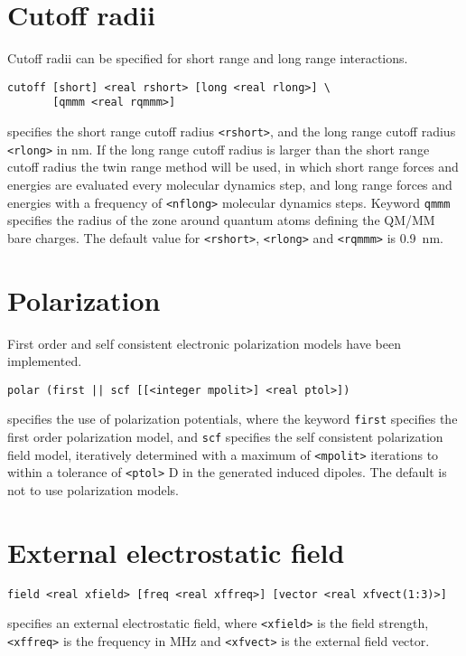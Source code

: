 \section{Cutoff radii}
Cutoff radii can be specified for short range and long range interactions.
\begin{description}
\item
\begin{verbatim}
cutoff [short] <real rshort> [long <real rlong>] \
       [qmmm <real rqmmm>]
\end{verbatim}
specifies the short range cutoff radius \verb+<rshort>+, and the long range
cutoff radius \verb+<rlong>+ in nm. If the long range cutoff radius
is larger than the short range cutoff radius the twin range method will
be used, in which short range forces and energies are evaluated every
molecular dynamics step, and long range forces and energies with a
frequency of \verb+<nflong>+ molecular dynamics steps. Keyword
\verb+qmmm+ specifies the radius of the zone around quantum atoms
defining the QM/MM bare charges.
The default value for \verb+<rshort>+, \verb+<rlong>+ and \verb+<rqmmm>+ 
is 0.9~nm.
\end{description}

\section{Polarization}
First order and self consistent electronic polarization models have
been implemented.
\begin{description}
\item
\begin{verbatim}
polar (first || scf [[<integer mpolit>] <real ptol>])
\end{verbatim}
specifies the use of polarization potentials,
where the keyword {\tt first} specifies the first order polarization
model, and {\tt scf} specifies the self consistent polarization field
model, iteratively determined with a maximum of \verb+<mpolit>+
iterations to within a tolerance of \verb+<ptol>+ D in the generated
induced dipoles. The default is not to use polarization models.
\end{description}

\section{External electrostatic field}
\begin{description}

\item
\begin{verbatim}
field <real xfield> [freq <real xffreq>] [vector <real xfvect(1:3)>]
\end{verbatim}
specifies an external electrostatic field,
where \verb+<xfield>+ is the field strength, \verb+<xffreq>+ is the
frequency in MHz and \verb+<xfvect>+ is the external field vector.
\end{description}

